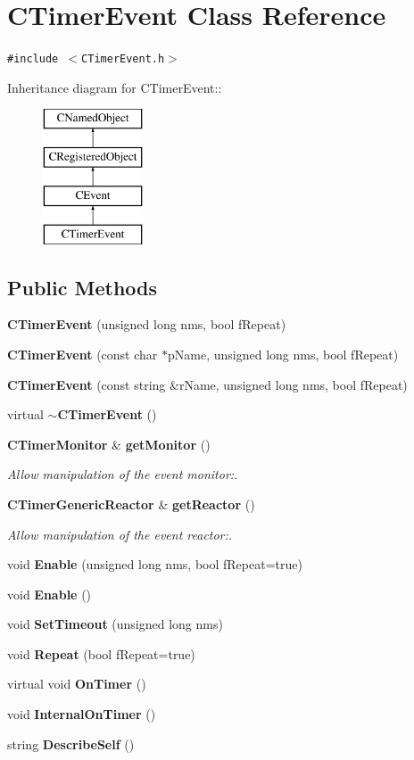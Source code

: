 \section{CTimer\-Event  Class Reference}
\label{classCTimerEvent}
{\tt \#include $<$CTimer\-Event.h$>$}

Inheritance diagram for CTimer\-Event::\begin{figure}[H]
\begin{center}
\leavevmode
\includegraphics[height=4cm]{classCTimerEvent}
\end{center}
\end{figure}
\subsection*{Public Methods}
\begin{CompactItemize}
\item 
{\bf CTimer\-Event} (unsigned long nms, bool f\-Repeat)
\item 
{\bf CTimer\-Event} (const char $\ast$p\-Name, unsigned long nms, bool f\-Repeat)
\item 
{\bf CTimer\-Event} (const string \&r\-Name, unsigned long nms, bool f\-Repeat)
\item 
virtual {\bf $\sim$CTimer\-Event} ()
\item 
{\bf CTimer\-Monitor} \& {\bf get\-Monitor} ()
\begin{CompactList}\small\item\em Allow manipulation of the event monitor:.\item\end{CompactList}\item 
{\bf CTimer\-Generic\-Reactor} \& {\bf get\-Reactor} ()
\begin{CompactList}\small\item\em Allow manipulation of the event reactor:.\item\end{CompactList}\item 
void {\bf Enable} (unsigned long nms, bool f\-Repeat=true)
\item 
void {\bf Enable} ()
\item 
void {\bf Set\-Timeout} (unsigned long nms)
\item 
void {\bf Repeat} (bool f\-Repeat=true)
\item 
virtual void {\bf On\-Timer} ()
\item 
void {\bf Internal\-On\-Timer} ()
\item 
string {\bf Describe\-Self} ()
\end{CompactItemize}
